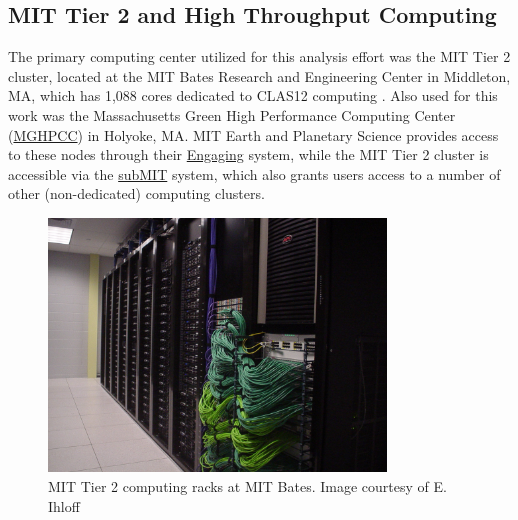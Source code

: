     


\subsection{MIT Tier 2 and High Throughput Computing}

    The primary computing center utilized for this analysis effort was the MIT Tier 2 cluster, located at the MIT Bates Research and Engineering Center in Middleton, MA, which has 1,088 cores dedicated to CLAS12 computing .  Also used for this work was the Massachusetts Green High Performance Computing Center (\href{https://www.mghpcc.org/}{MGHPCC}) in Holyoke, MA. MIT Earth and Planetary Science provides access to these nodes through their \href{https://engaging-ood.mit.edu/pun/sys/dashboard}{Engaging} system, while the MIT Tier 2 cluster is accessible via the \href{https://submit.mit.edu/}{subMIT} system, which also grants users access to a number of other (non-dedicated) computing clusters.

    




    \begin{figure}
        \centering
        \includegraphics[width=0.8\textwidth]{Chapters/Ch3-Simulations/overview/pics/Bates_Tier2.jpg}
        \caption[MIT Tier 2]{MIT Tier 2 computing racks at MIT Bates. Image courtesy of E. Ihloff}
        \label{fig:BatesComputing}
    \end{figure}


